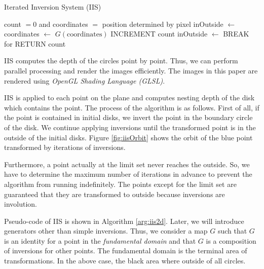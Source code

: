  \begin{algorithm}
  \caption{Iterated Inversion System (IIS)}
  \label{arg:iis2d}
  \begin{algorithmic}
   \REQUIRE count $= 0$ and coordinates $=$ position determined by
   pixel
   \STATE inOutside $\leftarrow$ \TRUE
   \STATE coordinates $\leftarrow$ $G(\text{coordinates})$
   \STATE INCREMENT count
   \STATE inOutside $\leftarrow$ \FALSE
   \ENDIF
   \ENDFOR
   \STATE BREAK for
   \ENDIF
   \ENDFOR
   \STATE RETURN count
  \end{algorithmic}
 \end{algorithm}

\noindent IIS computes the depth of the circles point by point.
Thus, we can perform parallel processing and render the images efficiently.
The images in this paper are rendered using \textit{OpenGL Shading
Language (GLSL)}.

IIS is applied to each point on the plane and computes nesting depth of
the disk which contains the point.
The process of the algorithm is as follows.
First of all, if the point is contained in initial disks, we invert the
point in the boundary circle of the disk.
We continue applying inversions until the transformed point is in the
outside of the initial disks.
Figure \ref{fig:iisOrbit} shows the orbit of the blue point transformed by
iterations of inversions.

Furthermore, a point actually at the limit set never reaches the
outside. So, we have to determine the maximum number of iterations in
advance to prevent the algorithm from running indefinitely.
The points except for the limit set are guaranteed that they
are transformed to outside because inversions are involution.

Pseudo-code of IIS is shown in Algorithm \ref{arg:iis2d}.
Later, we will introduce generators other than simple inversions.
Thus, we consider a map $G$ such that $G$ is an identity for a point in the
\textit{fundamental domain} and that $G$ is a composition of inversions for other
points.
The fundamental domain is the terminal area of transformations. 
In the above case, the black area where outside of all circles. 

